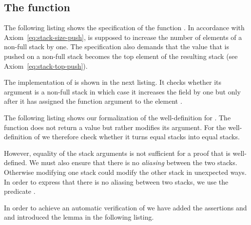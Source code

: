 
\subsection{The function \stackpush}

The following listing shows the specification of the function \stackpush.
In accordance with Axiom~\eqref{eq:stack-size-push}, \stackpush is supposed
to increase the number of elements of a non-full stack by one.
The specification also demands that the value that is pushed on a
non-full stack becomes the top element of the resulting stack (see 
Axiom~\eqref{eq:stack-top-push}).



The implementation of \stackpush is shown in the next listing.
It checks whether its argument is a non-full stack in which case it
increases the field  by one but only after it has assigned
the function argument to the element .



\vfill

The following listing shows our formalization of the well-definition for \stackpush.
%
The function \stackpush does not return a value but rather modifies its argument.
For the well-definition of \stackpush we therefore check whether it
turns equal stacks into equal stacks.



However, equality of the stack arguments is not sufficient for a proof
that \stackpush is well-defined.
We must also ensure that there is no \emph{aliasing} between the two stacks.
Otherwise modifying one stack could modify the other stack in unexpected ways.
In order to express that there is no aliasing between two stacks, 
we use the predicate .

In order to achieve an automatic verification of  we
have added the assertions  and \equal and introduced the lemma
 in the following listing.




